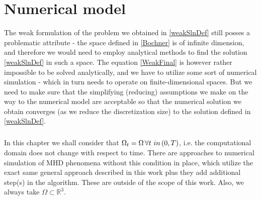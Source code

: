 \chapter{Numerical model}
The weak formulation of the problem we obtained in \ref{weakSlnDef} still posses a problematic attribute - the space defined in \ref{Bochner} is of infinite dimension, and therefore we would need to employ analytical methods to find the solution \ref{weakSlnDef} in such a space. The equation \ref{WeakFinal} is however rather impossible to be solved analytically, and we have to utilize some sort of numerical simulation - which in turn needs to operate on finite-dimensional spaces. But we need to make sure that the simplifying (reducing) assumptions we make on the way to the numerical model are acceptable so that the numerical solution we obtain converges (as we reduce the discretization size) to the solution defined in \ref{weakSlnDef}.

\paragraph{}
In this chapter we shall consider that $\Omega_t = \Omega\, \forall t \ in \left( 0, T\right) $, i.e. the computational domain does not change with respect to time. There are approaches to numerical simulation of MHD phenomena without this condition in place, which utilize the exact same general approach described in this work plus they add additional step(s) in the algorithm. These are outside of the scope of this work. Also, we always take $\Omega \subset \mathbb{R}^3$.











